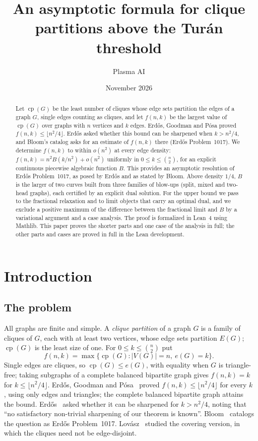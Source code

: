 \documentclass[10pt]{article}
\title{An asymptotic formula for clique partitions above the Tur\'an threshold}
\author{Plasma AI}
\date{November 2026}
\theoremstyle{definition}
\theoremstyle{remark}
\numberwithin{equation}{section}
\newcommand{\cp}{\operatorname{cp}}
\begin{document}
\maketitle

\begin{abstract}
Let $\cp(G)$ be the least number of cliques whose edge sets partition the edges of a graph $G$, single edges counting as cliques, and let $f(n,k)$ be the largest value of $\cp(G)$ over graphs with $n$ vertices and $k$ edges. Erd\H{o}s, Goodman and P\'osa proved $f(n,k)\le\lfloor n^2/4\rfloor$. Erd\H{o}s asked whether this bound can be sharpened when $k>n^2/4$, and Bloom's catalog asks for an estimate of $f(n,k)$ there (Erd\H{o}s Problem~1017). We determine $f(n,k)$ to within $o(n^2)$ at every edge density: $f(n,k)=n^2B(k/n^2)+o(n^2)$ uniformly in $0\le k\le\binom n2$, for an explicit continuous piecewise algebraic function $B$. This provides an asymptotic resolution of Erd\H{o}s Problem~1017, as posed by Erd\H{o}s and as stated by Bloom. Above density $1/4$, $B$ is the larger of two curves built from three families of blow-ups (split, mixed and two-head graphs), each certified by an explicit dual solution. For the upper bound we pass to the fractional relaxation and to limit objects that carry an optimal dual, and we exclude a positive maximum of the difference between the fractional limit and $B$ by a variational argument and a case analysis. The proof is formalized in Lean~4 using Mathlib. This paper proves the shorter parts and one case of the analysis in full; the other parts and cases are proved in full in the Lean development.
\end{abstract}

\section{Introduction}\label{sec:intro}

\subsection{The problem}
All graphs are finite and simple. A \emph{clique partition} of a graph $G$ is a family of cliques of $G$, each with at least two vertices, whose edge sets partition $E(G)$; $\cp(G)$ is the least size of one. For $0\le k\le\binom n2$ put
\[
 f(n,k)=\max\{\cp(G): |V(G)|=n,\ e(G)=k\}.
\]
Single edges are cliques, so $\cp(G)\le e(G)$, with equality when $G$ is triangle-free; taking subgraphs of a complete balanced bipartite graph gives $f(n,k)=k$ for $k\le\lfloor n^2/4\rfloor$. Erd\H{o}s, Goodman and P\'osa~\cite[Theorem~4]{EGP66} proved $f(n,k)\le\lfloor n^2/4\rfloor$ for every $k$, using only edges and triangles; the complete balanced bipartite graph attains the bound. Erd\H{o}s~\cite[item~11, p.~101]{Er71} asked whether it can be sharpened for $k>n^2/4$, noting that ``no satisfactory non-trivial sharpening of our theorem is known''. Bloom~\cite{Bloom} catalogs the question as Erd\H{o}s Problem~1017. Lov\'asz~\cite{Lo68} studied the covering version, in which the cliques need not be edge-disjoint.
\end{document}
